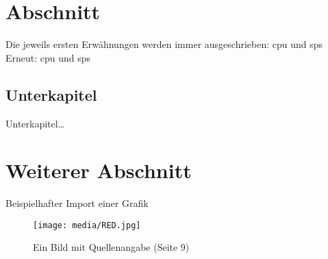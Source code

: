 
\section{Abschnitt}

Die jeweils ersten Erwähnungen werden immer ausgeschrieben:
\newline
\ac{cpu} und \ac{sps}
\newline
Erneut:
\newline
\ac{cpu} und \ac{sps}

\subsection{Unterkapitel}

Unterkapitel\ldots

\section{Weiterer Abschnitt}

Beispielhafter Import einer Grafik 
\begin{figure}[h]
  \vspace{0.3cm}
  \begin{center}
    \texttt{[image: media/RED.jpg]}
    \captionsetup{width=0.8\textwidth}
    \caption[Kurze Bildbeschreibung]{Ein Bild mit Quellenangabe \parencite[]{Siemens} (Seite 9)}
    \label{platzhalterx}
  \end{center}
  \vspace{-0.4cm}
\end{figure}
